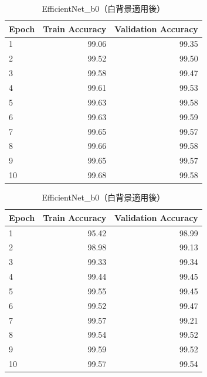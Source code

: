 \documentclass[a4paper,11pt,titlepage]{jsarticle}
\begin{document}
\begin{table}[H]
\begin{minipage}{0.49\hsize}
\centering
\caption{Custom Model（白背景適用後）}
\label{tab:Custom_white}
\begin{tabular}{lrr}
\hline
Epoch & Train Accuracy & Validation Accuracy \\
\hline
1 & 99.06 & 99.35 \\
2 & 99.52 & 99.50 \\
3 & 99.58 & 99.47 \\
4 & 99.61 & 99.53 \\
5 & 99.63 & 99.58 \\
6 & 99.63 & 99.59 \\
7 & 99.65 & 99.57 \\
8 & 99.66 & 99.58 \\
9 & 99.65 & 99.57 \\
10 & 99.68 & 99.58 \\
\hline
\end{tabular}
\end{minipage}
\hfill
\begin{minipage}{0.49\hsize}
\centering
\caption{EfficientNet\_b0（白背景適用後）}
\label{tab:Efficientnetb0_white}
\begin{tabular}{lrr}
\hline
Epoch & Train Accuracy & Validation Accuracy \\
\hline
1 & 95.42 & 98.99 \\
2 & 98.98 & 99.13 \\
3 & 99.33 & 99.34 \\
4 & 99.44 & 99.45 \\
5 & 99.55 & 99.45 \\
6 & 99.52 & 99.47 \\
7 & 99.57 & 99.21 \\
8 & 99.54 & 99.52 \\
9 & 99.59 & 99.52 \\
10 & 99.57 & 99.54 \\
\hline
\end{tabular}
\end{minipage}
\end{table}
\end{document}
